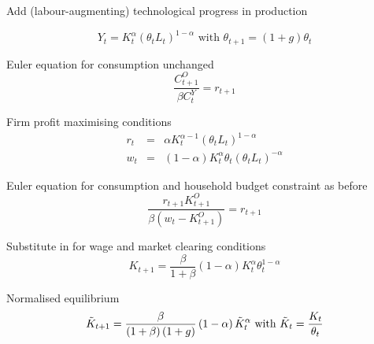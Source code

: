 \documentclass[notes=show]{beamer}
\begin{document}
\begin{frame}%


Add (labour-augmenting) technological progress in production

\begin{equation*}
Y_{t}=K_{t}^{\alpha }\left( \theta _{t}L_{t}\right) ^{1-\alpha }\text{ with }%
\theta _{t+1}=(1+g)\theta _{t}
\end{equation*}

Euler equation for consumption unchanged%
\begin{equation*}
\frac{C_{t+1}^{O}}{\beta C_{t}^{Y}}=r_{t+1}
\end{equation*}

Firm profit maximising conditions%
\begin{eqnarray*}
r_{t} &=&\alpha K_{t}^{\alpha -1}\left( \theta _{t}L_{t}\right) ^{1-\alpha }%
\text{ } \\
w_{t} &=&\left( 1-\alpha \right) K_{t}^{\alpha }\theta _{t}\left( \theta
_{t}L_{t}\right) ^{-\alpha }
\end{eqnarray*}

\transboxout%
\end{frame}%

\begin{frame}%


Euler equation for consumption and household budget constraint as before%
\begin{equation*}
\frac{r_{t+1}K_{t+1}^{O}}{\beta \left( w_{t}-K_{t+1}^{O}\right) }=r_{t+1}
\end{equation*}

Substitute in for wage and market clearing conditions%
\begin{equation*}
K_{t+1}=\frac{\beta }{1+\beta }\left( 1-\alpha \right) K_{t}^{\alpha }\theta
_{t}^{1-\alpha }
\end{equation*}

Normalised equilibrium%
\begin{equation*}
\tilde{K}_{t+1}=\frac{\beta }{\left( 1+\beta \right) (1+g)}\left( 1-\alpha
\right) \tilde{K}_{t}^{\alpha }\text{ with }\tilde{K}_{t}=\frac{K_{t}}{%
\theta _{t}}
\end{equation*}

\transboxout%
\end{frame}%
\end{document}
